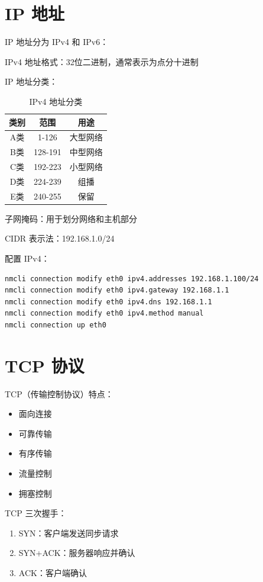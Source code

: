 \documentclass[12pt,UTF8]{ctexbook}
\begin{document}
\section{IP 地址}
\label{sec:ip_address}

IP 地址分为 IPv4 和 IPv6：

IPv4 地址格式：32位二进制，通常表示为点分十进制

IP 地址分类：
\begin{table}[htbp]
    \centering
    \caption{IPv4 地址分类}
    \begin{tabular}{|c|c|c|}
        \hline
        \textbf{类别} & \textbf{范围} & \textbf{用途} \\
        \hline
        A类 & 1-126 & 大型网络 \\
        \hline
        B类 & 128-191 & 中型网络 \\
        \hline
        C类 & 192-223 & 小型网络 \\
        \hline
        D类 & 224-239 & 组播 \\
        \hline
        E类 & 240-255 & 保留 \\
        \hline
    \end{tabular}
\end{table}

子网掩码：用于划分网络和主机部分

CIDR 表示法：192.168.1.0/24

配置 IPv4：
\begin{verbatim}
nmcli connection modify eth0 ipv4.addresses 192.168.1.100/24
nmcli connection modify eth0 ipv4.gateway 192.168.1.1
nmcli connection modify eth0 ipv4.dns 192.168.1.1
nmcli connection modify eth0 ipv4.method manual
nmcli connection up eth0
\end{verbatim}

\section{TCP 协议}
\label{sec:tcp}

TCP（传输控制协议）特点：
\begin{itemize}
    \item 面向连接
    \item 可靠传输
    \item 有序传输
    \item 流量控制
    \item 拥塞控制
\end{itemize}

TCP 三次握手：
\begin{enumerate}
    \item SYN：客户端发送同步请求
    \item SYN+ACK：服务器响应并确认
    \item ACK：客户端确认
\end{enumerate}
\end{document}
